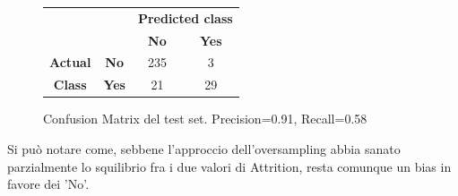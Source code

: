 \documentclass[a4paper,9pt]{article}
\begin{document}
\begin{figure}[H]
    \centering
\begin{tabular}{cc|cc}
\toprule
&\bfseries      & \multicolumn{2}{c}{\bfseries Predicted class} \\
& & \bfseries No & \bfseries Yes \\
\midrule
\bfseries Actual&\bfseries No  & 235 & 3  \\
\bfseries Class &\bfseries Yes & 21 & 29  \\
\bottomrule
\end{tabular}
\caption{Confusion Matrix del test set. Precision=0.91, Recall=0.58}
\end{figure}
Si può notare come, sebbene l'approccio dell'oversampling abbia sanato parzialmente lo squilibrio fra i due valori di Attrition, resta comunque un bias in favore dei 'No'.








\end{document}
